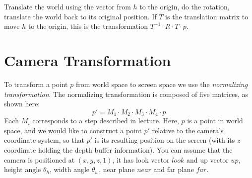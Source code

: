 \documentclass[10pt,twocolumn]{article}
\begin{document}
\begin{framed}
Translate the world using the vector from $h$ to the origin, do the rotation,
translate the world back to its original position. If $T$ is the translation 
matrix to move $h$ to the origin, this is the transformation 
$T^{-1}\cdot R\cdot T\cdot p$.
\end{framed}


\section{Camera Transformation}
To transform a point $p$ from world space to screen space we use the \emph{normalizing transformation}. The normalizing transformation is composed of five matrices, as shown here:
\[p' = M_1 \cdot M_2 \cdot M_3 \cdot M_4 \cdot p\]
Each $M_i$ corresponds to a step described in lecture. Here, $p$ is a point in world space, and we would like to construct a point $p'$ relative to the camera's coordinate system, so that $p'$ is its resulting position on the screen (with its $z$ coordinate holding the depth buffer information). You can assume that the camera is positioned at $(x,y,z,1)$, it has look vector $look$ and up vector $up$, height angle $\theta_h$, width angle $\theta_w$, near plane $near$ and far plane $far$.
\end{document}
